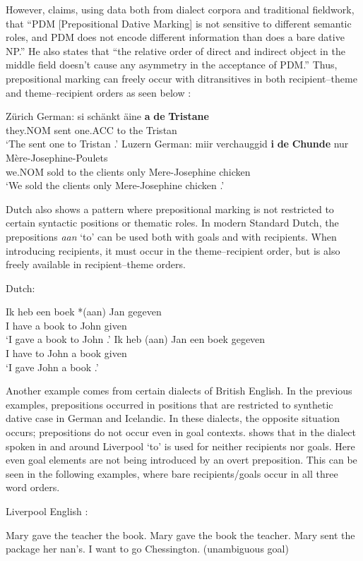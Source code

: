 	However, \cite{Seiler.2001} claims, using data both from dialect corpora and traditional fieldwork, that ``PDM [Prepositional Dative Marking] is not sensitive to different semantic roles, and PDM does not encode different information than does a bare dative NP.'' He also states that ``the relative order of direct and indirect object in the middle field doesn't cause any asymmetry in the acceptance of PDM.'' Thus, prepositional marking can freely occur with ditransitives in both recipient--theme and theme--recipient orders as seen below \citep{Seiler.2001,Seiler.2003}:
	\begin{exe}
		\ex Zürich German:
		\gll si schänkt äine \textbf{a} \textbf{de} \textbf{Tristane}\\
		they.NOM sent one.ACC to the Tristan\\
		\trans `The sent one to Tristan \citep[pg. 175]{Seiler.2003}.'
		\ex Luzern German:
		\gll miir verchauggid \textbf{i} \textbf{de} \textbf{Chunde} nur Mère-Josephine-Poulets\\
		we.NOM sold to the clients only Mere-Josephine chicken\\
		`We sold the clients only Mere-Josephine chicken \citep[pg. 175]{Seiler.2003}.'

	\end{exe}
	Dutch also shows a pattern where prepositional marking is not restricted to certain syntactic positions or thematic roles. In modern Standard Dutch, the prepositions \textit{aan} `to' can be used both with goals and with recipients. When introducing recipients, it must occur in the theme--recipient order, but is also freely available in recipient--theme orders.
	\begin{exe}
		\ex Dutch:
		\begin{xlist}
			\ex \gll Ik heb een boek *(aan) Jan gegeven\\
			I have a book to John given\\
			\trans `I gave a book to John \citep{Tiersma.1985}.'
			\ex \gll Ik heb (aan) Jan een boek gegeven\\
			I have to John a book given\\
			\trans `I gave John a book \citep{Tiersma.1985}.'
		\end{xlist}
	\end{exe}
	Another example comes from certain dialects of British English. In the previous examples, prepositions occurred in positions that are restricted to synthetic dative case in German and Icelandic. In these dialects, the opposite situation occurs; prepositions do not occur even in goal contexts. \cite{Biggs.2015} shows that in the dialect spoken in and around Liverpool `to' is used for neither recipients nor goals. Here even goal elements are not being introduced by an overt preposition. This can be seen in the following examples, where bare recipients/goals occur in all three word orders.
	\begin{exe}
		\ex Liverpool English \citep{Biggs.2015}:
		\begin{xlist}
			\ex Mary gave the teacher the book.
			\ex Mary gave the book the teacher.
			\ex Mary sent the package her nan's.
			\ex I want to go Chessington. (unambiguous goal)
		\end{xlist}
	\end{exe}
